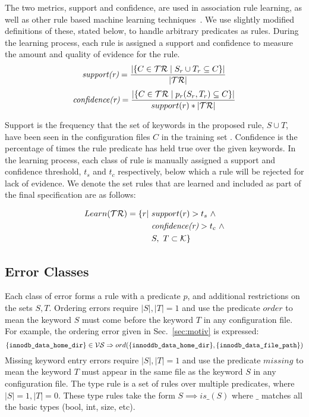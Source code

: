 The two metrics, support and confidence, are used in association rule learning, as well as other rule based machine learning techniques~\cite{han2007frequent,langley1995applications}.
We use slightly modified definitions of these, stated below, to handle arbitrary predicates as rules.
During the learning process, each rule is assigned a support and confidence to measure the amount and quality of evidence for the rule.
%
\begin{equation*}
 \textit{support(r)} = \frac{|\{C \in \mathcal{TR} \mid S_r \cup T_r \subseteq C\}|} {|\mathcal{TR}|}
\end{equation*}
\begin{equation*}
 \textit{confidence(r)} = \frac{|\{C \in \mathcal{TR} \mid p_r(S_r,T_r) \subseteq C\}| } {support(r)*|\mathcal{TR}|}
\end{equation*}

Support is the frequency that the set of keywords in the proposed rule, $S \cup T$, have been seen in the configuration files $C$ in the training set \trainingSet.
Confidence is the percentage of times the rule predicate has held true over the given keywords.
In the learning process, each class of rule is manually assigned a support and confidence threshold, $t_s$ and $t_c$ respectively, below which a rule will be rejected for lack of evidence.
We denote the set rules that are learned and included as part of the final specification are as follows:

\begin{align}
Learn(\mathcal{TR}) = \{r | \ &support(r) > t_s\ \land \nonumber \\
    & \textit{confidence(r)} > t_c\ \land \label{eq:learn}\\ 
    & S,\ T \subset \mathcal{K}\} \nonumber
\end{align}

\subsection{Error Classes}
Each class of error forms a rule with a predicate $p$, and additional restrictions on the sets $S, T$.
Ordering errors require $|S|, |T| = 1$ and use the predicate $order$ to mean the keyword $S$ must come before the keyword $T$ in any configuration file.
For example, the ordering error given in Sec.~\ref{sec:motiv} is expressed:
%
\begin{equation*}
\{\texttt{innodb\_data\_home\_dir}\} \in \mathcal{VS} \Rightarrow ord(\{\texttt{innoddb\_data\_home\_dir}\},\{\texttt{innodb\_data\_file\_path}\})
\end{equation*}
%
Missing keyword entry errors require $|S|, |T| = 1$ and use the predicate $missing$ to mean the keyword $T$ must appear in the same file as the keyword $S$ in any configuration file.
The type rule is a set of rules over multiple predicates, where $|S|=1, |T|=0$.
These type rules take the form $S \implies is\_(S)$ where $\_$ matches all the basic types (bool, int, size, etc).


